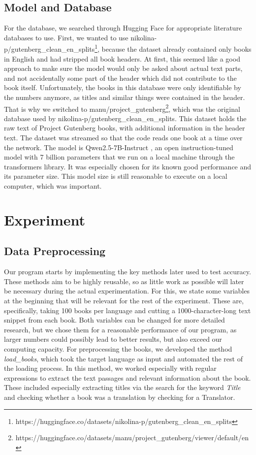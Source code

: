 \documentclass[11pt]{article}
\begin{document}
\subsection{Model and Database}
For the database, we searched through Hugging Face for appropriate literature databases to use. First, we wanted to use nikolina-p/gutenberg\_clean\_en\_splits\footnote{https://huggingface.co/datasets/nikolina-p/gutenberg\_clean\_en\_splits}, because the dataset already contained only books in English and had stripped all book headers. At first, this seemed like a good approach to make sure the model would only be asked about actual text parts, and not accidentally some part of the header which did not contribute to the book itself. Unfortunately, the books in this database were only identifiable by the numbers anymore, as titles and similar things were contained in the header. That is why we switched to manu/project\_gutenberg\footnote{https://huggingface.co/datasets/manu/project\_gutenberg/viewer/default/en}, which was the original database used by nikolina-p/gutenberg\_clean\_en\_splits. This dataset holds the raw text of Project Gutenberg books, with additional information in the header text. The dataset was streamed so that the code reads one book at a time over the network.
The model is Qwen2.5-7B-Instruct \cite{qwen2025}, an open instruction-tuned model with 7 billion parameters that we run on a local machine through the transformers library. It was especially chosen for its known good performance and its parameter size. This model size is still reasonable to execute on a local computer, which was important. 

\section{Experiment}
\subsection{Data Preprocessing}
Our program starts by implementing the key methods later used to test accuracy. These methods aim to be highly reusable, so as little work as possible will later be necessary during the actual experimentation. For this, we state some variables at the beginning that will be relevant for the rest of the experiment. These are, specifically, taking 100 books per language and cutting a 1000-character-long text snippet from each book. Both variables can be changed for more detailed research, but we chose them for a reasonable performance of our program, as larger numbers could possibly lead to better results, but also exceed our computing capacity. For preprocessing the books, we developed the method \textit{load\_books}, which took the target language as input and automated the rest of the loading process. In this method, we worked especially with regular expressions to extract the text passages and relevant information about the book. These included especially extracting titles via the search for the keyword \textit{Title} and checking whether a book was a translation by checking for a Translator. 
\end{document}
